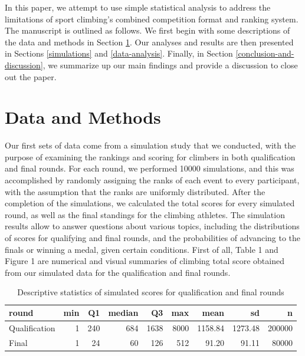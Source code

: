 \documentclass[12pt]{article}
\begin{document}
In this paper, we attempt to use simple statistical analysis to address
the limitations of sport climbing's combined competition format and
ranking system. The manuscript is outlined as follows. We first begin
with some descriptions of the data and methods in Section
\ref{data-and-methods}. Our analyses and results are then presented in
Sections \ref{simulations} and \ref{data-analysis}. Finally, in Section
\ref{conclusion-and-discussion}, we summarize up our main findings and
provide a discussion to close out the paper.

\hypertarget{data-and-methods}{%
\section{Data and Methods}\label{data-and-methods}}

Our first sets of data come from a simulation study that we conducted,
with the purpose of examining the rankings and scoring for climbers in
both qualification and final rounds. For each round, we performed 10000
simulations, and this was accomplished by randomly assigning the ranks
of each event to every participant, with the assumption that the ranks
are uniformly distributed. After the completion of the simulations, we
calculated the total scores for every simulated round, as well as the
final standings for the climbing athletes. The simulation results allow
to answer questions about various topics, including the distributions of
scores for qualifying and final rounds, and the probabilities of
advancing to the finals or winning a medal, given certain conditions.
First of all, Table 1 and Figure 1 are numerical and visual summaries of
climbing total score obtained from our simulated data for the
qualification and final rounds.

\begin{table}[H]

\caption{\label{tab:unnamed-chunk-4}Descriptive statistics of simulated scores for qualification and final rounds}
\centering
\begin{tabular}[t]{lrrrrrrrr}
\toprule
round & min & Q1 & median & Q3 & max & mean & sd & n\\
\midrule
Qualification & 1 & 240 & 684 & 1638 & 8000 & 1158.84 & 1273.48 & 200000\\
Final & 1 & 24 & 60 & 126 & 512 & 91.20 & 91.11 & 80000\\
\bottomrule
\end{tabular}
\end{table}
\end{document}
